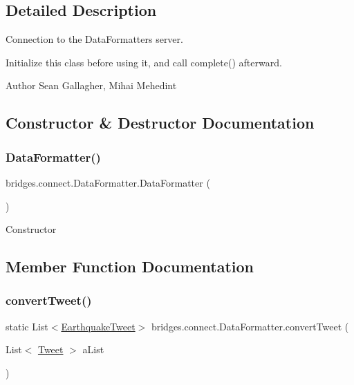 \subsection{Detailed Description}
Connection to the Data\+Formatters server.

Initialize this class before using it, and call complete() afterward.

\begin{DoxyAuthor}{Author}
Sean Gallagher, Mihai Mehedint 
\end{DoxyAuthor}


\subsection{Constructor \& Destructor Documentation}
\mbox{\label{classbridges_1_1connect_1_1_data_formatter_a31efd2251e98942e58e743dff213ef27}} 
\subsubsection{\texorpdfstring{DataFormatter()}{DataFormatter()}}
{\footnotesize\ttfamily bridges.\+connect.\+Data\+Formatter.\+Data\+Formatter (\begin{DoxyParamCaption}{ }\end{DoxyParamCaption})\hspace{0.3cm}{\ttfamily [protected]}}

Constructor 

\subsection{Member Function Documentation}
\mbox{\label{classbridges_1_1connect_1_1_data_formatter_ad87ca06456fa4dc110e167e84f2d4447}} 
\subsubsection{\texorpdfstring{convertTweet()}{convertTweet()}}
{\footnotesize\ttfamily static List$<$\mbox{\hyperlink{classbridges_1_1data__src__dependent_1_1_earthquake_tweet}{Earthquake\+Tweet}}$>$ bridges.\+connect.\+Data\+Formatter.\+convert\+Tweet (\begin{DoxyParamCaption}\item[{List$<$ \mbox{\hyperlink{classbridges_1_1data__src__dependent_1_1_tweet}{Tweet}} $>$}]{a\+List }\end{DoxyParamCaption})\hspace{0.3cm}{\ttfamily [static]}}

